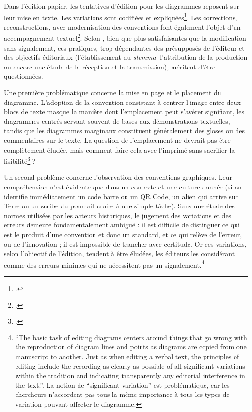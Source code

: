Dans l'édition papier, les tentatives d'édition pour les diagrammes
reposent sur leur mise en texte. Les variations sont codifiées et
expliquées\footcite[Voir les édition de]{de_young_editing_2014}.
Les corrections, reconstructions, avec modernisation des conventions
font également l'objet d'un accompagnement textuel\footcite[p.395]{jardine_critical_2010}.
Selon \citeauthor{jardine_critical_2010}, bien que plus satisfaisantes que la
modification sans signalement, ces pratiques, trop dépendantes des
présupposés de l'éditeur et des objectifs éditoriaux (l'établissement du
\textit{stemma}, l'attribution de la production ou encore une étude de la
réception et la transmission), méritent d'être questionnées.

Une première problématique concerne la mise en page et le placement du
diagramme. L'adoption de la convention consistant à centrer l'image
entre deux blocs de texte masque la manière dont l'emplacement peut
s'avérer signifiant, les diagrammes centrés servant souvent de bases aux
démonstrations textuelles, tandis que les diagrammes marginaux
constituent généralement des gloses ou des commentaires sur le texte. La
question de l'emplacement ne devrait pas être complètement éludée, mais
comment faire cela avec l'imprimé sans sacrifier la lisibilité\footcite[p.400]{jardine_critical_2010} ? 

Un second problème concerne l'observation des conventions graphiques.
Leur compréhension n'est évidente que dans un contexte et une culture
donnée (si on identifie immédiatement un code barre ou un QR Code, un
alien qui arrive sur Terre ou un scribe du \ma pourrait croire à
une simple tâche). Sans une étude des normes utilisées par les acteurs
historiques, le jugement des variations et des erreurs demeure
fondamentalement ambiguë : il est difficile de distinguer ce qui est le
produit d'une convention et donc un standard, et ce qui relève de
l'erreur, ou de l'innovation ; il est impossible de trancher avec
certitude. Or ces variations, selon l'objectif de l'édition, tendent à
être éludées, les éditeurs les considérant comme des erreurs minimes qui
ne nécessitent pas un signalement.\footnote{\enquote{The basic task of editing
  diagrams centers around things that go wrong with the reproduction of
  diagram lines and points as diagrams are copied from one manuscript to
  another. Just as when editing a verbal text, the principles of editing
  include the recording as clearly as possible of all significant
  variations within the tradition and indicating transparently any
  editorial interference in the text.}\cite[p.229]{de_young_editing_2014}. La
  notion de ``significant variation'' est problématique, car les
  chercheurs n'accordent pas tous la même importance à tous les types de
  variation pouvant affecter le diagramme.}

